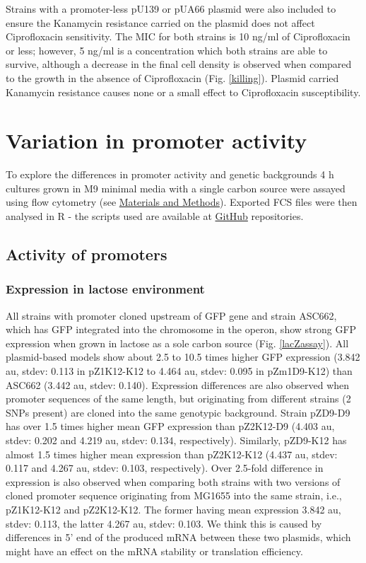 Strains with a promoter-less pU139 or pUA66 plasmid were also included to ensure the Kanamycin resistance carried on the plasmid does not affect Ciprofloxacin sensitivity.
The MIC for both strains is 10 ng/ml of Ciprofloxacin or less; however, 5 ng/ml is a concentration which both strains are able to survive, although a decrease in the final cell density is observed when compared to the growth in the absence of Ciprofloxacin (Fig. \ref{killing}).
Plasmid carried Kanamycin resistance causes none or a small effect to Ciprofloxacin susceptibility.


\section{Variation in promoter activity}
To explore the differences in promoter activity and genetic backgrounds 4 h cultures grown in M9 minimal media with a single carbon source were assayed using flow cytometry (see \hyperlink{FC}{Materials and Methods}).
Exported FCS files were then analysed in R - the scripts used are available at \href{https://github.com/marketavlkova/}{GitHub} repositories.

\subsection{Activity of  promoters}
\subsubsection{Expression in lactose environment}
All strains with  promoter cloned upstream of GFP gene and strain ASC662, which has GFP integrated into the chromosome in the  operon, show strong GFP expression when grown in lactose as a sole carbon source (Fig. \ref{lacZassay}).
All plasmid-based models show about 2.5 to 10.5 times higher GFP expression (3.842 au, stdev: 0.113 in pZ1\textunderscore K12-K12 to 4.464 au, stdev: 0.095 in pZm1\textunderscore D9-K12) than ASC662 (3.442 au, stdev: 0.140).
Expression differences are also observed when promoter sequences of the same length, but originating from different strains (2 SNPs present) are cloned into the same genotypic background.
Strain pZ\textunderscore D9-D9 has over 1.5 times higher mean GFP expression than pZ2\textunderscore K12-D9 (4.403 au, stdev: 0.202 and 4.219 au, stdev: 0.134, respectively).
Similarly, pZ\textunderscore D9-K12 has almost 1.5 times higher mean expression than pZ2\textunderscore K12-K12 (4.437 au, stdev: 0.117 and 4.267 au, stdev: 0.103, respectively).
Over 2.5-fold difference in expression is also observed when comparing both strains with two versions of cloned promoter sequence originating from MG1655 into the same strain, i.e., pZ1\textunderscore K12-K12 and pZ2\textunderscore K12-K12.
The former having mean expression 3.842 au, stdev: 0.113, the latter 4.267 au, stdev: 0.103.
We think this is caused by differences in 5' end of the produced mRNA between these two plasmids, which might have an effect on the mRNA stability or translation efficiency.

